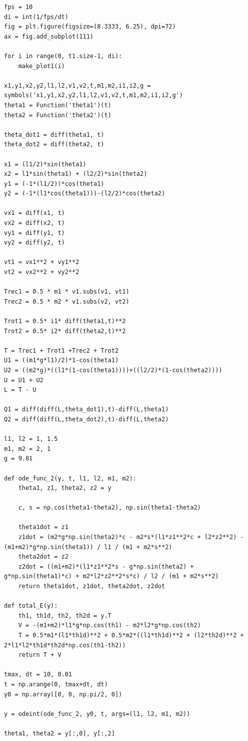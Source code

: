 \documentclass[12pt, a4paper]{article}
\begin{document}
\begin{verbatim}
fps = 10
di = int(1/fps/dt)
fig = plt.figure(figsize=(8.3333, 6.25), dpi=72)
ax = fig.add_subplot(111)

for i in range(0, t1.size-1, di):
    make_plot1(i)

x1,y1,x2,y2,l1,l2,v1,v2,t,m1,m2,i1,i2,g = symbols('x1,y1,x2,y2,l1,l2,v1,v2,t,m1,m2,i1,i2,g')
theta1 = Function('theta1')(t)
theta2 = Function('theta2')(t)

theta_dot1 = diff(theta1, t)
theta_dot2 = diff(theta2, t)

x1 = (l1/2)*sin(theta1)
x2 = l1*sin(theta1) + (l2/2)*sin(theta2)
y1 = (-1*(l1/2))*cos(theta1)
y2 = (-1*(l1*cos(theta1)))-(l2/2)*cos(theta2)

vx1 = diff(x1, t)
vx2 = diff(x2, t)
vy1 = diff(y1, t)
vy2 = diff(y2, t)

vt1 = vx1**2 + vy1**2
vt2 = vx2**2 + vy2**2

Trec1 = 0.5 * m1 * v1.subs(v1, vt1)
Trec2 = 0.5 * m2 * v1.subs(v2, vt2)

Trot1 = 0.5* i1* diff(theta1,t)**2
Trot2 = 0.5* i2* diff(theta2,t)**2

T = Trec1 + Trot1 +Trec2 + Trot2
U1 = ((m1*g*l1)/2)*1-cos(theta1)
U2 = ((m2*g)*((l1*(1-cos(theta1))))+((l2/2)*(1-cos(theta2))))
U = U1 + U2
L = T - U

Q1 = diff(diff(L,theta_dot1),t)-diff(L,theta1)
Q2 = diff(diff(L,theta_dot2),t)-diff(L,theta2)

l1, l2 = 1, 1.5
m1, m2 = 2, 1
g = 9.81

def ode_func_2(y, t, l1, l2, m1, m2):
    theta1, z1, theta2, z2 = y

    c, s = np.cos(theta1-theta2), np.sin(theta1-theta2)

    theta1dot = z1
    z1dot = (m2*g*np.sin(theta2)*c - m2*s*(l1*z1**2*c + l2*z2**2) - (m1+m2)*g*np.sin(theta1)) / l1 / (m1 + m2*s**2)
    theta2dot = z2
    z2dot = ((m1+m2)*(l1*z1**2*s - g*np.sin(theta2) + g*np.sin(theta1)*c) + m2*l2*z2**2*s*c) / l2 / (m1 + m2*s**2)
    return theta1dot, z1dot, theta2dot, z2dot

def total_E(y):
    th1, th1d, th2, th2d = y.T
    V = -(m1+m2)*l1*g*np.cos(th1) - m2*l2*g*np.cos(th2)
    T = 0.5*m1*(l1*th1d)**2 + 0.5*m2*((l1*th1d)**2 + (l2*th2d)**2 + 2*l1*l2*th1d*th2d*np.cos(th1-th2))
    return T + V

tmax, dt = 10, 0.01
t = np.arange(0, tmax+dt, dt)
y0 = np.array([0, 0, np.pi/2, 0])

y = odeint(ode_func_2, y0, t, args=(l1, l2, m1, m2))

theta1, theta2 = y[:,0], y[:,2]


\end{verbatim}
\end{document}
